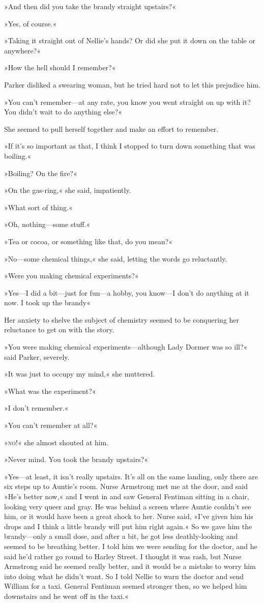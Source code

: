 »And then did you take the brandy straight upstairs?«

»Yes, of course.«

»Taking it straight out of Nellie's hands? Or did she put it down on the table or anywhere?«

»How the hell should I remember?«

Parker disliked a swearing woman, but he tried hard not to let this prejudice him.

»You can't remember—at any rate, you know you went straight on up with it? You didn't wait to do anything else?«

She seemed to pull herself together and make an effort to remember.

»If it's so important as that, I think I stopped to turn down something that was boiling.«

»Boiling? On the fire?«

»On the gas-ring,« she said, impatiently.

»What sort of thing.«

»Oh, nothing—some stuff.«

»Tea or cocoa, or something like that, do you mean?«

»No—some chemical things,« she said, letting the words go reluctantly.

»Were you making chemical experiments?«

»Yes—I did a bit—just for fun—a hobby, you know—I don't do anything at it now. I took up the brandy\longdash«

Her anxiety to shelve the subject of chemistry seemed to be conquering her reluctance to get on with the story.

»You were making chemical experiments—although Lady Dormer was so ill?« said Parker, severely.

»It was just to occupy my mind,« she muttered.

»What was the experiment?«

»I don't remember.«

»You can't remember at all?«

»\textsc{no}!« she almost shouted at him.

»Never mind. You took the brandy upstairs?«

»Yes—at least, it isn't really upstairs. It's all on the same landing, only there are six steps up to Auntie's room. Nurse Armstrong met me at the door, and said »He's better now,« and I went in and saw General Fentiman sitting in a chair, looking very queer and gray. He was behind a screen where Auntie couldn't see him, or it would have been a great shock to her. Nurse said, »I've given him his drops and I think a little brandy will put him right again.« So we gave him the brandy—only a small dose, and after a bit, he got less deathly-looking and seemed to be breathing better. I told him we were sending for the doctor, and he said he'd rather go round to Harley Street. I thought it was rash, but Nurse Armstrong said he seemed really better, and it would be a mistake to worry him into doing what he didn't want. So I told Nellie to warn the doctor and send William for a taxi. General Fentiman seemed stronger then, so we helped him downstairs and he went off in the taxi.«


